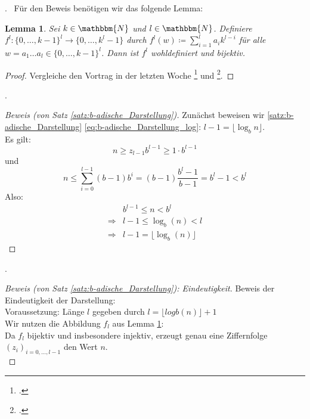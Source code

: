 \documentclass{beamer}
\newcommand{\N}{\mathbbm{N}} %
\newtheorem{lem}[satz]{Lemma}
\newcommand{\subsecframe}{\begin{frame}{\insertsectionnumber.\insertsubsectionnumber \ \insertsubsection}}
\begin{document}
        \subsecframe
            Für den Beweis benötigen wir das folgende Lemma:
            \begin{lem} \label{lemma:Eindeutigkeit_b-adische_Darstellung}
                Sei $k \in \N$ und $l \in \N$. 
                Definiere $f^l \colon \{0, \dots, k-1\}^l \to \{0, \dots, k^l-1\}$ durch $f^l(w) \coloneq \sum_{i=1}^l a_i k^{l-i}$ für alle $w=a_1 \dots a_l \in \{0, \dots, k-1\}^l$.
                Dann ist $f^l$ wohldefiniert und bijektiv.
            \end{lem}
            \begin{proof}
                Vergleiche den Vortrag in der letzten Woche \footcite{chung2026} und \footcite[S. 17, Lemma 1.19]{hougardy2018}.
            \end{proof}
        \end{frame}

        \subsecframe
            \begin{proof}[Beweis (von Satz \ref{satz:b-adische_Darstellung})]
                Zunächst beweisen wir \ref{satz:b-adische_Darstellung} \eqref{eq:b-adische_Darstellung_log}: $l-1 = \lfloor \log_b n \rfloor$.\\
                \vspace{\baselineskip}
                Es gilt: \[n \geq z_{l-1}b^{l-1} \geq 1\cdot b^{l-1}\]
                und \[n \leq \sum_{i=0}^{l-1} (b-1)b^i = (b-1) \frac{b^l-1}{b-1} = b^l - 1 < b^l\]
                Also:
                \begin{align*}
                    &b^{l-1} \leq n < b^l \\
                    \Rightarrow &{l-1} \leq \log_b (n) < l \\
                    \Rightarrow &l-1 = \lfloor \log_b(n) \rfloor
                \end{align*}
            \end{proof}
        \end{frame}

        \subsecframe
            \begin{proof}[Beweis (von Satz \ref{satz:b-adische_Darstellung}): Eindeutigkeit]
                Beweis der Eindeutigkeit der Darstellung: \\
                \vspace{\baselineskip}
                Voraussetzung: Länge $l$ gegeben durch $l = \lfloor logb(n) \rfloor + 1$ \\
                \vspace{\baselineskip}
                Wir nutzen die Abbildung $f_l$ aus Lemma \ref{lemma:Eindeutigkeit_b-adische_Darstellung}: \\
                Da $f_l$ bijektiv und insbesondere injektiv, erzeugt genau eine Ziffernfolge $(z_i)_{i=0,\dots,l-1}$ den Wert $n$. \\
                
            \end{proof}
        \end{frame}
\end{document}
